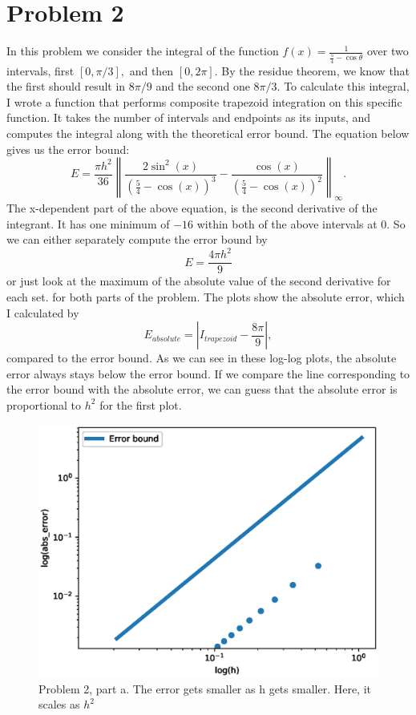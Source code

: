 \documentclass[12pt,letterpaper]{article}
\newcommand\norm[1]{\left\lVert#1\right\rVert}
\begin{document}
\section*{Problem 2} In this problem we consider the integral of the function $f(x) = \frac{1}{\frac{5}{4}-\cos \theta}$ over two intervals, first $[0,\pi/3],$ and then $[0,2 \pi]$. By the residue theorem, we know that the first should result in $8\pi/9$ and the second one $8 \pi/3$. 
\newline To calculate this integral, I wrote a function that performs composite trapezoid integration on this specific function. It takes the number of intervals and endpoints as its inputs, and computes the integral along with the theoretical error bound. The equation below gives us the error bound:
\begin{equation}
    E = \frac{\pi h^2}{36} \norm{\dfrac{2\sin^2\left(x\right)}{\left(\frac{5}{4}-\cos\left(x\right)\right)^3}-\dfrac{\cos\left(x\right)}{\left(\frac{5}{4}-\cos\left(x\right)\right)^2}}_\infty .
\end{equation}
The x-dependent part of the above equation, is the second derivative of the integrant. It has one minimum of $-16$ within both of the above intervals at 0. So we can either separately compute the error bound by 
\begin{equation}
    E = \frac{4\pi h^2}{9} 
\end{equation}
or just look at the maximum of the absolute value of the second derivative for each set.
for both parts of the problem. The plots show the absolute error, which I calculated by
\begin{equation}
    E_{absolute} = |I_{trapezoid} - \frac{8 \pi}{9}|,
\end{equation}
compared to the error bound. As we can see in these log-log plots, the absolute error always stays below the error bound. 
\newline If we compare the line corresponding to the error bound with the absolute error, we can guess that the absolute error is proportional to $h^2$ for the first plot.

\begin{figure}[h]
    \centering
    \includegraphics[width = 12cm]{Problem_2/hw3_2a.eps}
    \caption{Problem 2, part a. The error gets smaller as h gets smaller. Here, it scales as $h^2$} 
    \label{fig:2a}
\end{figure}
\end{document}
